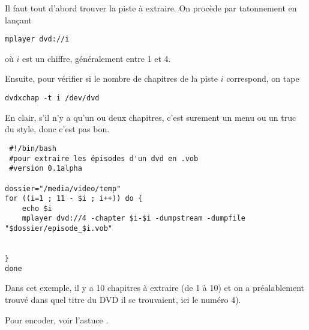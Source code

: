 \documentclass[a4paper,twoside]{article}
\begin{document}
Il faut tout d'abord trouver la piste à extraire. On procède par tatonnement en lançant
\begin{verbatim}
mplayer dvd://i
\end{verbatim}
où $i$ est un chiffre, généralement entre 1 et 4.

Ensuite, pour vérifier si le nombre de chapitres de la piste $i$ correspond, on tape
\begin{verbatim}
dvdxchap -t i /dev/dvd
\end{verbatim}

En clair, s'il n'y a qu'un ou deux chapitres, c'est surement un menu ou un truc du style, donc c'est pas bon.


\begin{verbatim}
 #!/bin/bash
 #pour extraire les épisodes d'un dvd en .vob
 #version 0.1alpha

dossier="/media/video/temp"
for ((i=1 ; 11 - $i ; i++)) do {
	echo $i
	mplayer dvd://4 -chapter $i-$i -dumpstream -dumpfile "$dossier/episode_$i.vob"


}
done
\end{verbatim}

Dans cet exemple, il y a 10 chapitres à extraire (de 1 à 10) et on a préalablement trouvé dans quel titre du DVD il se trouvaient, ici le numéro 4).

Pour encoder, voir l'astuce .
\end{document}
